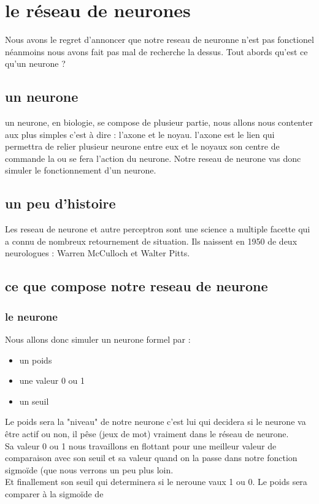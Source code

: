 \section{le réseau de neurones}
Nous avons le regret d'annoncer que notre reseau de neuronne n'est pas fonctionel
néanmoins nous avons fait pas mal de recherche la dessus. Tout abords qu'est ce qu'un neurone ? 
\subsection{un neurone}
un neurone, en biologie, se compose de plusieur partie, nous allons nous contenter aux plus simples c'est à dire : l'axone et le noyau. l'axone est le lien qui permettra de relier plusieur neurone entre eux et le noyaux son centre de commande la ou se fera l'action du neurone. Notre reseau de neurone vas donc simuler le fonctionnement d'un neurone.
\subsection{un peu d'histoire}
Les reseau de neurone et autre perceptron sont une science a multiple facette qui a connu de nombreux retournement de situation. Ils naissent en 1950 de deux neurologues : Warren McCulloch et Walter Pitts.
\subsection{ce que compose notre reseau de neurone}
\subsubsection{le neurone}
Nous allons donc simuler un neurone formel par : 
\begin{itemize}
\item un poids 
\item une valeur 0 ou 1 
\item un seuil
\end{itemize}
Le poids sera la "niveau" de notre neurone c'est lui qui decidera si le neurone va être actif ou non, il pêse (jeux de mot) vraiment dans le réseau de neurone.\\
Sa valeur 0 ou 1 nous travaillons en flottant pour une meilleur valeur de comparaison avec son seuil et sa valeur quand on la passe dans notre fonction sigmoïde (que nous verrons un peu plus loin.\\
Et finallement son seuil qui determinera si le neroune vaux 1 ou 0. Le poids sera comparer à la sigmoïde de 
